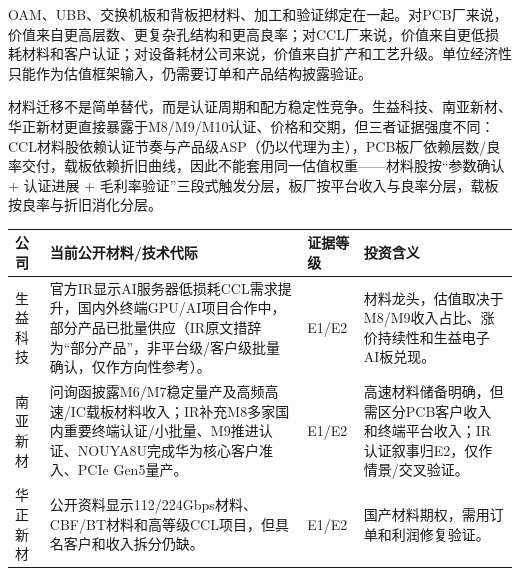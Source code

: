 OAM、UBB、交换机板和背板把材料、加工和验证绑定在一起。对PCB厂来说，价值来自更高层数、更复杂孔结构和更高良率；对CCL厂来说，价值来自更低损耗材料和客户认证；对设备耗材公司来说，价值来自扩产和工艺升级。单位经济性只能作为估值框架输入，仍需要订单和产品结构披露验证。

\begin{exhibitbox}[图表3-7：M6--M10高频高速材料迁移]
\centering
{}
\end{exhibitbox}

材料迁移不是简单替代，而是认证周期和配方稳定性竞争。生益科技、南亚新材、华正新材更直接暴露于M8/M9/M10认证、价格和交期，但三者证据强度不同：CCL材料股依赖认证节奏与产品级ASP（仍以代理为主），PCB板厂依赖层数/良率交付，载板依赖折旧曲线，因此不能套用同一估值权重——材料股按``参数确认 + 认证进展 + 毛利率验证''三段式触发分层，板厂按平台收入与良率分层，载板按良率与折旧消化分层。

\begin{exhibitbox}[图表3-8：材料代际和公司映射]
\footnotesize
\begin{tabularx}{\textwidth}{L{2.0cm}X L{1.6cm}X}
\toprule
\textbf{公司} & \textbf{当前公开材料/技术代际} & \textbf{证据等级} & \textbf{投资含义} \\
\midrule
生益科技 & 官方IR显示AI服务器低损耗CCL需求提升，国内外终端GPU/AI项目合作中，部分产品已批量供应（IR原文措辞为``部分产品''，非平台级/客户级批量确认，仅作方向性参考）。 & E1/E2 & 材料龙头，估值取决于M8/M9收入占比、涨价持续性和生益电子AI板兑现。 \\
南亚新材 & 问询函披露M6/M7稳定量产及高频高速/IC载板材料收入；IR补充M8多家国内重要终端认证/小批量、M9推进认证、NOUYA8U完成华为核心客户准入、PCIe Gen5量产。 & E1/E2 & 高速材料储备明确，但需区分PCB客户收入和终端平台收入；IR认证叙事归E2，仅作情景/交叉验证。 \\
华正新材 & 公开资料显示112/224Gbps材料、CBF/BT材料和高等级CCL项目，但具名客户和收入拆分仍缺。 & E1/E2 & 国产材料期权，需用订单和利润修复验证。 \\
\bottomrule
\end{tabularx}
\end{exhibitbox}

